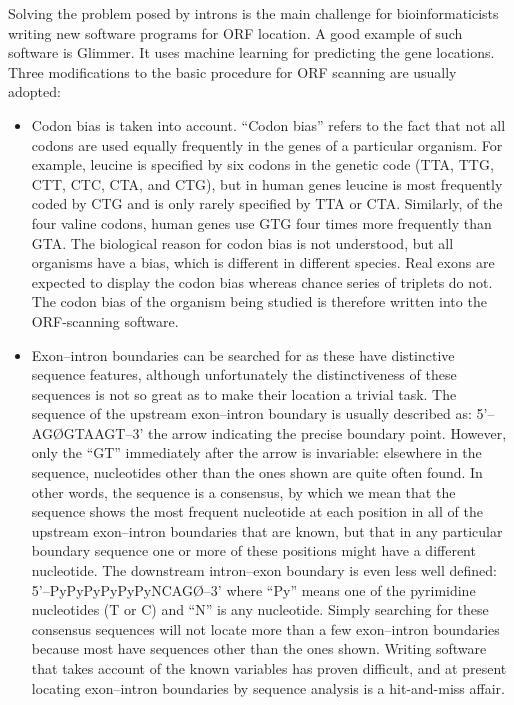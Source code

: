 Solving the problem posed by introns is the main challenge for bioinformaticists writing new software programs for ORF location. A good example of such software
is Glimmer. It uses machine learning for predicting the gene locations. Three modifications to the basic procedure for ORF scanning are usually adopted:

\begin{itemize}
	\item Codon bias is taken into account. “Codon bias” refers to the fact that not all codons are used equally frequently in the genes of a particular organism. 
	For example, leucine is specified by six codons in the genetic code (TTA, TTG, CTT, CTC, CTA, and CTG), but in human genes leucine is most frequently coded by 
	CTG and is only rarely specified by TTA or CTA. Similarly, of the four valine codons, human genes use GTG four times more frequently than GTA. The biological 
	reason for codon bias is not understood, but all organisms have a bias, which is different in different species. Real exons are expected to display the codon 
	bias whereas chance series of triplets do not. The codon bias of the organism being studied is therefore written into the ORF-scanning software.

	\item Exon–intron boundaries can be searched for as these have distinctive sequence features, although unfortunately the distinctiveness of these
	sequences is not so great as to make their location a trivial task. The sequence of the upstream exon–intron boundary is usually described as:
	5'–AGØGTAAGT–3' the arrow indicating the precise boundary point. However, only the “GT” immediately after the arrow is invariable: elsewhere in the sequence,
	nucleotides other than the ones shown are quite often found. In other words, the sequence is a consensus, by which we mean that the sequence shows the
	most frequent nucleotide at each position in all of the upstream exon–intron boundaries that are known, but that in any particular boundary sequence
	one or more of these positions might have a different nucleotide. The downstream intron–exon boundary is even less well defined: 5'–PyPyPyPyPyPyNCAGØ–3'
	where “Py” means one of the pyrimidine nucleotides (T or C) and “N” is any nucleotide. Simply searching for these consensus sequences will not
	locate more than a few exon–intron boundaries because most have sequences other than the ones shown. Writing software that takes account of the 
	known variables has proven difficult, and at present locating exon–intron boundaries by sequence analysis is a hit-and-miss affair.


\end{itemize}
